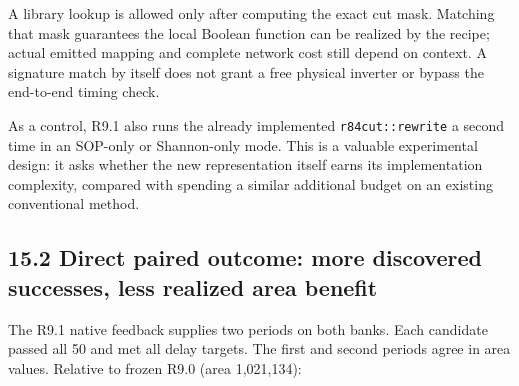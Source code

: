 A library lookup is allowed only after computing the exact cut mask. Matching that mask guarantees the local Boolean function can be realized by the recipe; actual emitted mapping and complete network cost still depend on context. A signature match by itself does not grant a free physical inverter or bypass the end-to-end timing check.

As a control, R9.1 also runs the already implemented \texttt{r84cut::rewrite} a second time in an SOP-only or Shannon-only mode. This is a valuable experimental design: it asks whether the new representation itself earns its implementation complexity, compared with spending a similar additional budget on an existing conventional method.

\subsection{15.2 Direct paired outcome: more discovered successes, less realized area benefit}\label{direct-paired-outcome-more-discovered-successes-less-realized-area-benefit}

The R9.1 native feedback supplies two periods on both banks. Each candidate passed all 50 and met all delay targets. The first and second periods agree in area values. Relative to frozen R9.0 (area 1,021,134):


